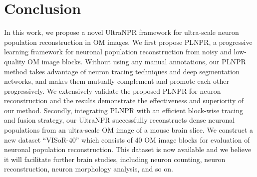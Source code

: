 \documentclass[journal]{IEEEtran}
\begin{document}





\section{Conclusion}
\label{sec:conclusion}
In this work, we propose a novel UltraNPR framework for ultra-scale neuron population reconstruction in OM images.
%
We first propose PLNPR, a progressive learning framework for neuronal population reconstruction from noisy and low-quality OM image blocks.
Without using any manual annotations, our PLNPR method takes advantage of neuron tracing techniques and deep segmentation networks, and makes them mutually complement and promote each other progressively.
We extensively validate the proposed PLNPR for neuron reconstruction and the results demonstrate the effectiveness and superiority of our method.
Secondly, integrating PLNPR with an efficient block-wise tracing and fusion strategy, our UltraNPR successfully reconstructs dense neuronal populations from an ultra-scale OM image of a mouse brain slice.
%
We construct a new dataset ``VISoR-40'' which consists of 40 OM image blocks for evaluation of neuronal population reconstruction.
This dataset is now available and we believe it will facilitate further brain studies, including neuron counting, neuron reconstruction, neuron morphology analysis, and so on.


%
\end{document}

